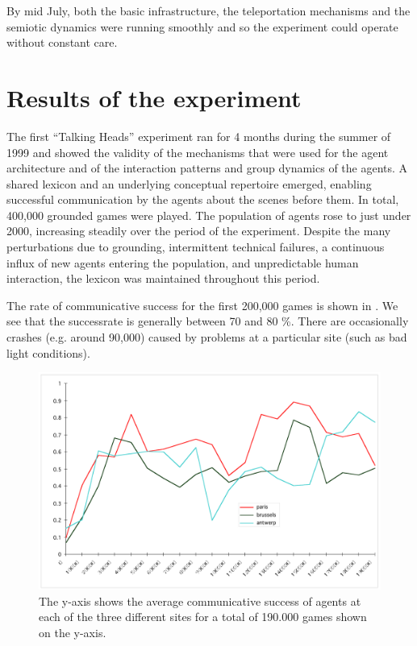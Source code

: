By mid July, both the basic infrastructure, the teleportation mechanisms and the semiotic dynamics were running 
smoothly and so the experiment could operate without constant care. 

\section{Results of the experiment}

The first ``Talking Heads'' experiment ran for 4 months during the summer of 1999 and showed the validity of the mechanisms that were used for the agent architecture and of the interaction patterns and group dynamics of the agents. A shared lexicon and an underlying conceptual repertoire emerged, enabling successful communication by the agents about the scenes before them. In total, 400,000 grounded games were played. The population of agents rose to just under 2000, increasing steadily over the period of the experiment. Despite the many perturbations due to grounding, intermittent technical failures, a continuous influx of new agents entering the population, and unpredictable human interaction, the lexicon was maintained throughout this period.

The rate of communicative success for the first 200,000 games is shown in . We see that the successrate is generally between 70 and 80 \%. There are occasionally crashes (e.g. around 90,000) caused by problems at a particular site (such as bad light conditions). 


\begin{figure}[htbp]
  \centerline{\includegraphics[width=\textwidth]{chap8/figures/allsites.pdf}}
\caption{\label{fig:allsites}The y-axis shows the average communicative success of agents at each of the three different sites for a total 
of 190.000 games shown on the y-axis. 
}
\end{figure}

